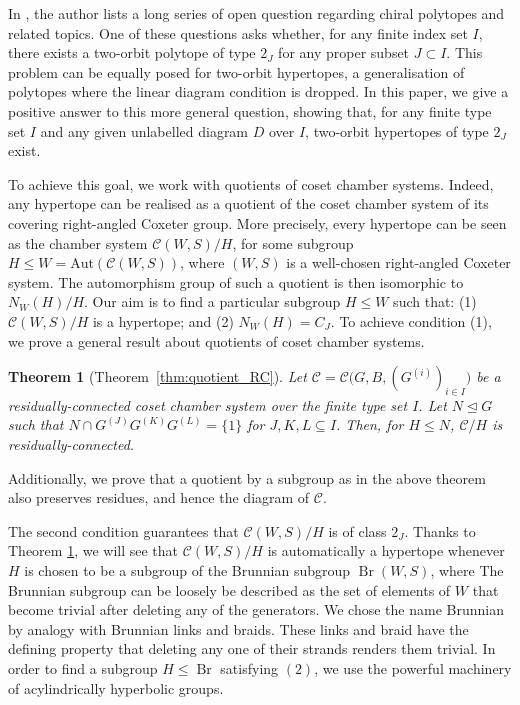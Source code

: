 \documentclass[10pt,a4paper]{amsart}
\newtheorem{thmalpha}{Theorem}
\newcommand{\CC}{\mathcal{C}}
\newcommand{\Aut}{\mathrm{Aut}}
\newcommand{\C}{\mathcal{C}}
\newcommand{\Br}{\operatorname{Br}}
\begin{document}
In \cite{Pellicer_2025}, the author lists a long series of open question regarding chiral polytopes and related topics. One of these questions asks whether, for any finite index set $I$, there exists a two-orbit polytope of type $2_J$ for any proper subset $J \subset I$. 
This problem can be equally posed for two-orbit hypertopes, a generalisation of polytopes where the linear diagram condition is dropped.
In this paper, we give a positive answer to this more general question, showing that, for any finite type set $I$ and any given unlabelled diagram $D$ over $I$, two-orbit hypertopes of type $2_J$ exist. 

To achieve this goal, we work with quotients of coset chamber systems. Indeed, any hypertope can be realised as a quotient of the coset chamber system of its covering right-angled Coxeter group. More precisely, every hypertope can be seen as the chamber system $\C(W,S)/H$, for some subgroup $H\leq W = \Aut(\C(W,S))$, where $(W,S)$ is a well-chosen right-angled Coxeter system. The automorphism group of such a quotient is then isomorphic to $N_W(H)/H$. Our aim is to find a particular subgroup $H\leq W$ such that: (1) $\C(W,S)/H$ is a hypertope; and (2) $N_W(H) = C_J$.
To achieve condition (1), we prove a general result about quotients of coset chamber systems.
\begin{thmalpha}[Theorem~\ref{thm:quotient_RC}]\label{thm:A}
    Let $\CC=\CC\bigl(G,B,(G^{(i)})_{i\in I}\bigr)$
be a residually-connected coset chamber system over the finite type set $I$.  Let $N\trianglelefteq G$ such that $N\cap G^{(J)}G^{(K)}G^{(L)} = \{1\}$ for $J,K,L\subseteq I$. 
Then, for $H\leq N$, $\CC/H$ is
residually-connected.
\end{thmalpha}
Additionally, we prove that a quotient by a subgroup as in the above theorem also preserves residues, and hence the diagram of $\C$.

The second condition guarantees that $\C(W,S)/H$ is of class $2_J$.
Thanks to Theorem \ref{thm:A}, we will see that $\C(W,S)/H$ is automatically a hypertope whenever $H$ is chosen to be a subgroup of the Brunnian subgroup $\Br(W,S)$, where The Brunnian subgroup can be loosely be described as the set of elements of $W$ that become trivial after deleting any of the generators.
We chose the name Brunnian by analogy with Brunnian links and braids. These links and braid have the defining property that deleting any one of their strands renders them trivial. In order to find a subgroup $H \leq \Br$ satisfying $(2)$, we use the powerful machinery of acylindrically hyperbolic groups.
\end{document}
